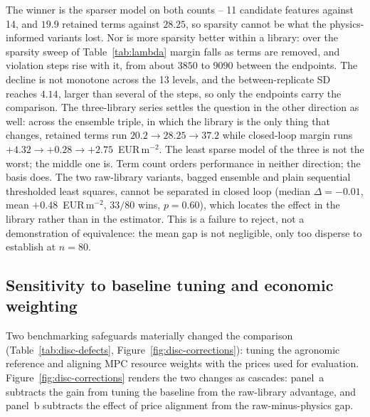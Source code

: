 The winner is the sparser model on both counts -- 11 candidate features against
14, and $19.9$ retained terms against $28.25$, so sparsity cannot be what the
physics-informed variants lost. Nor is more sparsity better within a library:
over the sparsity sweep of Table~\ref{tab:lambda} margin falls as terms are
removed, and violation steps rise with it, from about $3850$ to $9090$ between
the endpoints. The decline is not monotone across the 13 levels, and
the between-replicate SD reaches $4.14$, larger than several of the steps, so
only the endpoints carry the comparison. The three-library series settles the
question in the other direction as well: across the ensemble triple, in which the
library is the only thing that changes, retained terms run
$20.2 \rightarrow 28.25 \rightarrow 37.2$ while closed-loop margin runs
$+4.32 \rightarrow +0.28 \rightarrow +2.75$~EUR\,m$^{-2}$. The least sparse model
of the three is not the worst; the middle one is.
Term count orders performance in neither direction; the basis does. The two
raw-library variants, bagged ensemble and plain sequential thresholded least squares, cannot be separated in closed loop (median $\Delta=-0.01$, mean
$+0.48$~EUR\,m$^{-2}$, $33/80$ wins, $p=0.60$), which locates the effect in the
library rather than in the estimator. This is a failure to reject, not a
demonstration of equivalence: the mean gap is not negligible, only too disperse
to establish at $n=80$.

\subsection{Sensitivity to baseline tuning and economic weighting}
\label{sec:disc-defects}

Two benchmarking safeguards materially changed the comparison
(Table~\ref{tab:disc-defects}, Figure~\ref{fig:disc-corrections}): tuning the agronomic
reference and aligning MPC resource weights with the prices used for evaluation.
Figure~\ref{fig:disc-corrections} renders the two changes as cascades: panel~a subtracts
the gain from tuning the baseline from the raw-library advantage, and panel~b subtracts
the effect of price alignment from the raw-minus-physics gap.

